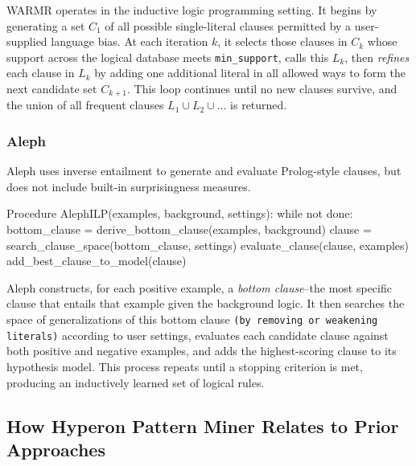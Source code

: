 \documentclass{article}
\begin{document}
\begin{algpseudocode}
WARMR operates in the inductive logic programming setting.  It begins by generating a set $C_1$ of all possible single-literal clauses permitted by a user-supplied language bias.  At each iteration $k$, it selects those clauses in $C_k$ whose support across the logical database meets \texttt{min\_support}, calls this $L_k$, then \emph{refines} each clause in $L_k$ by adding one additional literal in all allowed ways to form the next candidate set $C_{k+1}$.  This loop continues until no new clauses survive, and the union of all frequent clauses $L_1 \cup L_2 \cup \dots$ is returned.

\subsubsection{Aleph}

Aleph \cite{srinivasan2002aleph} uses inverse entailment to generate and evaluate Prolog-style clauses, but does not include built-in surprisingness measures.

\begin{algpseudocode}
Procedure AlephILP(examples, background, settings):
    while not done:
        bottom_clause = derive_bottom_clause(examples, background)
        clause = search_clause_space(bottom_clause, settings)
        evaluate_clause(clause, examples)
        add_best_clause_to_model(clause)
\end{algpseudocode}

Aleph constructs, for each positive example, a \emph{bottom clause}--the most specific clause that entails that example given the background logic.  It then searches the space of generalizations of this bottom clause \texttt{(by removing or weakening literals)} according to user settings, evaluates each candidate clause against both positive and negative examples, and adds the highest-scoring clause to its hypothesis model.  This process repeats until a stopping criterion is met, producing an inductively learned set of logical rules.

\subsection{How Hyperon Pattern Miner Relates to Prior Approaches}



\end{algpseudocode}
\end{document}
